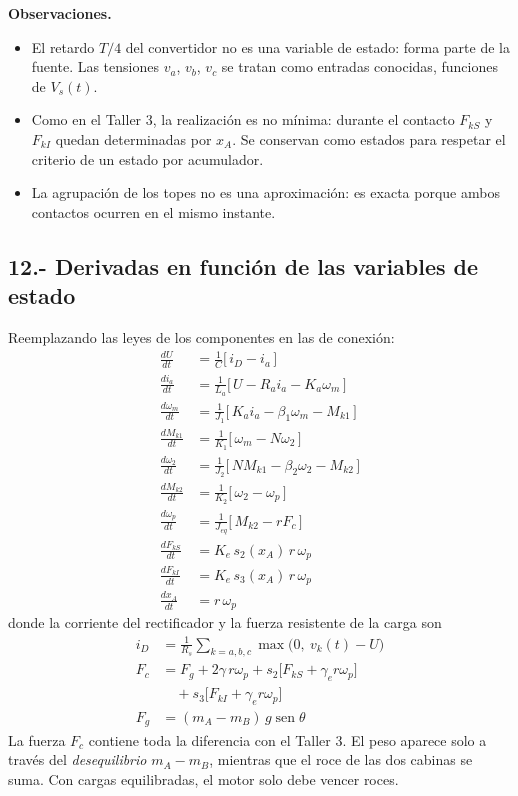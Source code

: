 \documentclass[10pt,a4paper,twocolumn]{article}
\DeclareMathOperator{\sen}{sen}
\begin{document}
\noindent\textbf{Observaciones.}
\begin{itemize}
  \item El retardo $T/4$ del convertidor no es una variable de estado: forma parte de la
        fuente. Las tensiones $v_a$, $v_b$, $v_c$ se tratan como entradas conocidas,
        funciones de $V_s(t)$.
  \item Como en el Taller 3, la realización es no mínima: durante el contacto $F_{kS}$ y
        $F_{kI}$ quedan determinadas por $x_A$. Se conservan como estados para respetar el
        criterio de un estado por acumulador.
  \item La agrupación de los topes no es una aproximación: es exacta porque ambos
        contactos ocurren en el mismo instante.
\end{itemize}

\subsection*{12.- Derivadas en función de las variables de estado}

Reemplazando las leyes de los componentes en las de conexión:
\begin{align}
  \frac{dU}{dt}       &= \frac{1}{C}\big[\, i_D - i_a \,\big] \tag{12.1}\label{eq:x1}\\
  \frac{di_a}{dt}     &= \frac{1}{L_a}\big[\, U - R_a i_a - K_a\omega_m \,\big] \tag{12.2}\\
  \frac{d\omega_m}{dt}&= \frac{1}{J_1}\big[\, K_a i_a - \beta_1\omega_m - M_{k1} \,\big] \tag{12.3}\\
  \frac{dM_{k1}}{dt}  &= \frac{1}{K_1}\big[\, \omega_m - N\omega_2 \,\big] \tag{12.4}\\
  \frac{d\omega_2}{dt}&= \frac{1}{J_2}\big[\, N M_{k1} - \beta_2\omega_2 - M_{k2} \,\big] \tag{12.5}\\
  \frac{dM_{k2}}{dt}  &= \frac{1}{K_2}\big[\, \omega_2 - \omega_p \,\big] \tag{12.6}\\
  \frac{d\omega_p}{dt}&= \frac{1}{J_{eq}}\big[\, M_{k2} - r F_c \,\big] \tag{12.7}\label{eq:x7}\\
  \frac{dF_{kS}}{dt}  &= K_e\, s_2(x_A)\, r\,\omega_p \tag{12.8}\\
  \frac{dF_{kI}}{dt}  &= K_e\, s_3(x_A)\, r\,\omega_p \tag{12.9}\\
  \frac{dx_A}{dt}     &= r\,\omega_p \tag{12.10}\label{eq:x10}
\end{align}
donde la corriente del rectificador y la fuerza resistente de la carga son
\begin{align*}
  i_D &= \frac{1}{R_s}\sum_{k=a,b,c}\max\big(0,\ v_k(t) - U\big) \\
  F_c &= F_g + 2\gamma\, r\omega_p + s_2\big[F_{kS} + \gamma_e r\omega_p\big] \\
      &\quad + s_3\big[F_{kI} + \gamma_e r\omega_p\big] \\
  F_g &= (m_A - m_B)\, g\sen\theta
\end{align*}
La fuerza $F_c$ contiene toda la diferencia con el Taller 3. El peso aparece solo a través
del \emph{desequilibrio} $m_A - m_B$, mientras que el roce de las dos cabinas se suma. Con
cargas equilibradas, el motor solo debe vencer roces.
\end{document}

